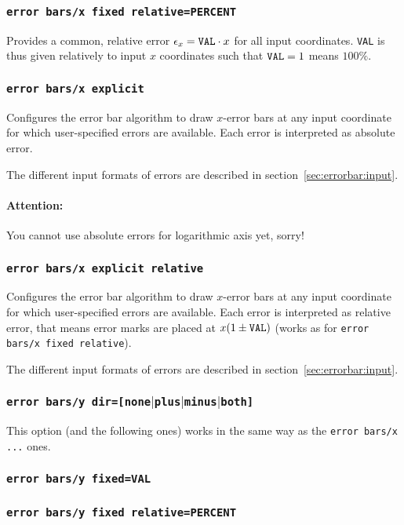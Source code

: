 {\subsubsection{\texttt{error bars/x fixed relative=PERCENT}}
Provides a common, relative error $\epsilon_{x} = \text{\texttt{VAL}} \cdot x$ for all input coordinates. \texttt{VAL} is thus given relatively to input $x$ coordinates such that $\text{\texttt{VAL}} = 1$ means $100\%$.

\subsubsection{\texttt{error bars/x explicit}}
Configures the error bar algorithm to draw $x$-error bars at any input coordinate for which user-specified errors are available.
 Each error is interpreted as absolute error.

The different input formats of errors are described in section~\ref{sec:errorbar:input}.

\paragraph{Attention:} You cannot use absolute errors for logarithmic axis yet, sorry!

\subsubsection{\texttt{error bars/x explicit relative}}
Configures the error bar algorithm to draw $x$-error bars at any input coordinate for which user-specified errors are available.
 Each error is interpreted as relative error, that means error marks are placed at $x (1 \pm \text{\texttt{VAL}})$ (works as for \texttt{error bars/x fixed relative}).

The different input formats of errors are described in section~\ref{sec:errorbar:input}.

\subsubsection{\texttt{error bars/y dir=[none$|$plus$|$minus$|$both]}}
This option (and the following ones) works in the same way as the \texttt{error bars/x ...} ones.
\subsubsection{\texttt{error bars/y fixed=VAL}}
\subsubsection{\texttt{error bars/y fixed relative=PERCENT}}
}

